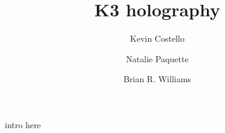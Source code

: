 \documentclass[11pt]{amsart}
\title{K3 holography}
\author{Kevin Costello}
\author{Natalie Paquette}
\author{Brian R. Williams}
\begin{document}
\maketitle

\begin{abstract} %
\end{abstract}

\tableofcontents

intro here










\end{document}
